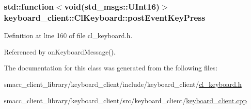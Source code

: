 \subsubsection[{\texorpdfstring{post\+Event\+Key\+Press}{postEventKeyPress}}]{\setlength{\rightskip}{0pt plus 5cm}std\+::function$<$void(std\+\_\+msgs\+::\+U\+Int16)$>$ keyboard\+\_\+client\+::\+Cl\+Keyboard\+::post\+Event\+Key\+Press}\hypertarget{classkeyboard__client_1_1ClKeyboard_aadd675eea47a012b348a4e6c00e7e9d0}{}\label{classkeyboard__client_1_1ClKeyboard_aadd675eea47a012b348a4e6c00e7e9d0}


Definition at line 160 of file cl\+\_\+keyboard.\+h.



Referenced by on\+Keyboard\+Message().



The documentation for this class was generated from the following files\+:\begin{DoxyCompactItemize}
\item 
smacc\+\_\+client\+\_\+library/keyboard\+\_\+client/include/keyboard\+\_\+client/\hyperlink{cl__keyboard_8h}{cl\+\_\+keyboard.\+h}\item 
smacc\+\_\+client\+\_\+library/keyboard\+\_\+client/src/keyboard\+\_\+client/\hyperlink{keyboard__client_8cpp}{keyboard\+\_\+client.\+cpp}\end{DoxyCompactItemize}
